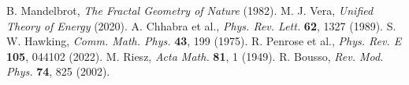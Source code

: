 \documentclass[prd,superscriptaddress]{revtex4-2}
\theoremstyle{plain}
\theoremstyle{definition}
\theoremstyle{corollary}
\begin{document}

\begin{thebibliography}{9}
 B. Mandelbrot, \textit{The Fractal Geometry of Nature} (1982).
 M. J. Vera, \textit{Unified Theory of Energy} (2020).
 A. Chhabra et al., \textit{Phys. Rev. Lett.} \textbf{62}, 1327 (1989).
 S. W. Hawking, \textit{Comm. Math. Phys.} \textbf{43}, 199 (1975).
 R. Penrose et al., \textit{Phys. Rev. E} \textbf{105}, 044102 (2022).
 M. Riesz, \textit{Acta Math.} \textbf{81}, 1 (1949).
 R. Bousso, \textit{Rev. Mod. Phys.} \textbf{74}, 825 (2002).
\end{thebibliography}
\end{document}
